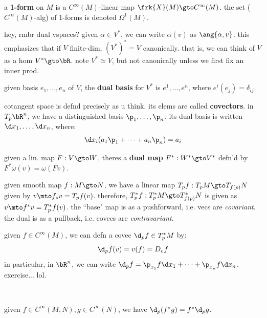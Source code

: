 \begin{defn}[title=Functional]
	a \textbf{1-form} on $M$ is a $C^{\infty}(M)$-linear map $\frk{X}(M)\gto C^{\infty}(M)$.
	the set ($C^{\infty}(M)$-alg) of 1-forms is denoted $\Omega^{1}(M)$.
\end{defn}
hey, rmbr dual vspaces?
given $\alpha\in V^{*}$, we can write $\alpha(v)$ as $\ang{\alpha,v}$.
this emphasizes that if $V$ finite-dim, $(V^{*})^{*}=V$ canonically.
that is, we can think of $V$ as a hom $V^{*}\gto\bR$.
note $V^{*}\simeq V$, but not canonically unless we first fix an inner prod.

\begin{defn}
	given basis $e_{1},\dots,e_{n}$ of $V$, the \textbf{dual basis} for $V^{*}$
	is $e^{1},\dots,e^{n}$, where $e^{i}(e_{j})=\delta_{ij}$.
\end{defn}
cotangent space is defnd precisely as u think.
its elems are called \textbf{covectors}.
in $T_{p}\bR^{n}$, we have a distinguished basis $\p_{1},\dots,\p_{n}$.
its dual basis is written $\d x_{1},\dots,\d x_{n}$, where:
\begin{equation*}
	\d x_{i}(a_{1}\p_{1}+\dots +a_{n}\p_{n})=a_{i}
\end{equation*}

\begin{defn}
	given a lin. map $F:V\gto W$, theres a \textbf{dual map} $F^{*}:W^{*}\gto V^{*}$
	defn'd by $F^{*}\omega(v)=\omega(Fv)$.
\end{defn}
given smooth map $f:M\gto N$, we have a linear map $T_{p}f:T_{p}M\gto T_{f(p)}N$
given by $v\mto f_{*}v=T_{p}f(v)$.
therefore, $T_{p}^{*}f:T_{p}^{*}M\gto T_{f(p)}^{*}N$ is given as
$v\mto f^{*}v=T_{p}^{*}f(v)$.
the ``base" map is as a pushforward, i.e. vecs are \textit{covariant}.
the dual is as a pullback, i.e. covecs are \textit{contravariant}.

\begin{xmp}
	given $f\in C^{\infty}(M)$, we can defn a covec $\d_{p}f\in T^{*}_{p}M$ by:
	\begin{equation*}
		\d_{p}f(v)=v(f)=D_{v}f
	\end{equation*}
	in particular, in $\bR^{n}$, we can write
	$\d_{p}f=\p_{x_{1}}f\d x_{1}+\dots +\p_{x_{n}}f\d x_{n}$.
	exercise... lol.
\end{xmp} \

\begin{prop}
	given $f\in C^{\infty}(M,N),g\in C^{\infty}(N)$, we have
	$\d_{p}(f^{*}g)=f^{*}\d_{p} g$.
\end{prop} \

